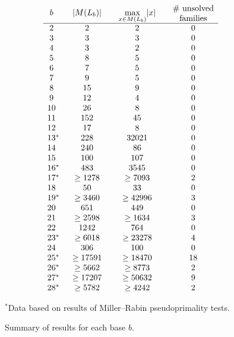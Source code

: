 \documentclass[12pt]{article}
\theoremstyle{plain}
\theoremstyle{definition}
\theoremstyle{remark}
\newcommand{\0}{\mathtt{0}}
\newcommand{\1}{\mathtt{1}}
\newcommand{\2}{\mathtt{2}}
\newcommand{\3}{\mathtt{3}}
\newcommand{\4}{\mathtt{4}}
\newcommand{\5}{\mathtt{5}}
\newcommand{\6}{\mathtt{6}}
\newcommand{\7}{\mathtt{7}}
\newcommand{\8}{\mathtt{8}}
\newcommand{\9}{\mathtt{9}}
\begin{document}
\begin{figure}\[\begin{array}{c@{\qquad}c@{\qquad}c@{\qquad}c}
b & \lvert M(L_b)\rvert & \max\limits_{x\in M(L_b)}\lvert x\rvert & \parbox{5em}{\centering\# unsolved\\families} \\ \hline
2 & 2 & 2 & 0 \\ 
3 & 3 & 3 & 0 \\ 
4 & 3 & 2 & 0 \\ 
5 & 8 & 5 & 0 \\ 
6 & 7 & 5 & 0 \\ 
7 & 9 & 5 & 0 \\ 
8 & 15 & 9 & 0 \\ 
9 & 12 & 4 & 0 \\ 
10 & 26 & 8 & 0 \\ 
11 & 152 & 45 & 0 \\ 
12 & 17 & 8 & 0 \\ 
13\mathrlap{^*} & 228 & 32021 & 0 \\ 
14 & 240 & 86 & 0 \\ 
15 & 100 & 107 & 0 \\ 
16\mathrlap{^*} & 483 & 3545 & 0 \\ 
17\mathrlap{^*} & \geq1278 & \geq7093 & 2 \\ 
18 & 50 & 33 & 0 \\ 
19\mathrlap{^*} & \geq3460 & \geq42996 & 3 \\ 
20 & 651 & 449 & 0 \\ 
21 & \geq2598 & \geq1634 & 3 \\ 
22 & 1242 & 764 & 0 \\ 
23\mathrlap{^*} & \geq6018 & \geq23278 & 4 \\ 
24 & 306 & 100 & 0 \\ 
25\mathrlap{^*} & \geq17591 & \geq18470 & 18 \\ 
26\mathrlap{^*} & \geq5662 & \geq8773 & 2 \\ 
27\mathrlap{^*} & \geq17207 & \geq50632 & 9 \\ 
28\mathrlap{^*} & \geq5782 & \geq4242 & 2 
\end{array}\]
\begin{center}$^*$Data based on results of Miller--Rabin pseudoprimality tests.\end{center}
\caption{Summary of results for each base $b$.}
\label{resultsfig}
\end{figure}
\end{document}
